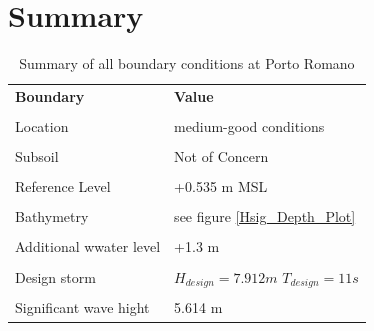 \section{Summary}
\begin{center}
\begin{table}[!htb]
\begin{tabu}{X[2l] X[2c]}
\toprule[2pt]
\textbf{Boundary} & \textbf{Value} \\
\\
\midrule
Location & medium-good conditions\\
\\
Subsoil & Not of Concern\\
\\
Reference Level & +0.535 m MSL\\
\\
Bathymetry & see figure \ref{Hsig_Depth_Plot} \\
\\
Additional wwater level & +1.3 m\\
\\
Design storm & $H_{design}=7.912 m$ $T_{design}=11 s$ \\
\\
Significant wave hight & 5.614 m\\
\bottomrule[2pt]
\end{tabu}
\caption{Summary of all boundary conditions at Porto Romano}
\label{tab:summary_boundary}
\end{table}
\end{center}
 